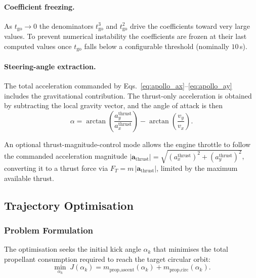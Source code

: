 \paragraph{Coefficient freezing.}
As $t_{\text{go}} \to 0$ the denominators $t_{\text{go}}^3$ and
$t_{\text{go}}^2$ drive the coefficients toward very large values.  To prevent
numerical instability the coefficients are frozen at their last computed values
once $t_{\text{go}}$ falls below a configurable threshold (nominally $10$\,s).

\paragraph{Steering-angle extraction.}
The total acceleration commanded by Eqs.~\eqref{eq:apollo_ax}--\eqref{eq:apollo_ay}
includes the gravitational contribution.  The thrust-only acceleration is
obtained by subtracting the local gravity vector, and the angle of attack is
then
\begin{equation}
  \alpha = \arctan\!\left(\frac{a_y^{\text{thrust}}}{a_x^{\text{thrust}}}\right)
           - \arctan\!\left(\frac{v_y}{v_x}\right).
  \label{eq:apollo_alpha}
\end{equation}

An optional thrust-magnitude-control mode allows the engine throttle to follow
the commanded acceleration magnitude
$|\mathbf{a}_{\text{thrust}}| = \sqrt{(a_x^{\text{thrust}})^2 +
(a_y^{\text{thrust}})^2}$, converting it to a thrust force via $F_T = m\,
|\mathbf{a}_{\text{thrust}}|$, limited by the maximum available thrust.

\subsection{Trajectory Optimisation}
\label{ssec:optimisation}

\subsubsection{Problem Formulation}
\label{sssec:opt_formulation}

The optimisation seeks the initial kick angle $\alpha_k$ that minimises the
total propellant consumption required to reach the target circular orbit:
\begin{equation}
  \min_{\alpha_k}\; J(\alpha_k)
    = m_{\text{prop,ascent}}(\alpha_k)
    + m_{\text{prop,circ}}(\alpha_k).
  \label{eq:obj}
\end{equation}


